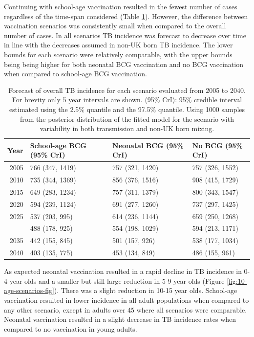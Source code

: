 \documentclass[11pt,twoside]{bristolthesis}
\begin{document}
  Continuing with school-age vaccination resulted in the fewest number of cases regardless of the time-span considered (Table \ref{tab:10-table-future-incidence}). However, the difference between vaccination scenarios was consistently small when compared to the overall number of cases. In all scenarios TB incidence was forecast to decrease over time in line with the decreases assumed in non-UK born TB incidence. The lower bounds for each scenario were relatively comparable, with the upper bounds being being higher for both neonatal BCG vaccination and no BCG vaccination when compared to school-age BCG vaccination.
  \begin{longtable}{rlll}
  \caption[Forecast of overall TB incidence for each scenario evaluated from 2005 to 2040.]{\label{tab:10-table-future-incidence}Forecast of overall TB incidence for each scenario evaluated from 2005 to 2040. For brevity only 5 year intervals are shown. (95\% CrI): 95\% credible interval estimated using the 2.5\% quantile and the 97.5\% quantile. Using 1000 samples from the posterior distribution of the fitted model for the scenario with variability in both transmission and non-UK born mixing.}\\
  \toprule
  Year & School-age BCG (95\% CrI) & Neonatal BCG (95\% CrI) & No BCG (95\% CrI)\\
  \midrule
  2005 & 766 (347, 1419) & 757 (321, 1420) & 757 (326, 1552)\\
  2010 & 735 (344, 1369) & 856 (376, 1516) & 908 (415, 1729)\\
  2015 & 649 (283, 1234) & 757 (311, 1379) & 800 (343, 1547)\\
  2020 & 594 (239, 1124) & 691 (277, 1260) & 737 (297, 1425)\\
  2025 & 537 (203, 995) & 614 (236, 1144) & 659 (250, 1268)\\
  \addlinespace
  2030 & 488 (178, 925) & 554 (198, 1029) & 594 (213, 1171)\\
  2035 & 442 (155, 845) & 501 (157, 926) & 538 (177, 1034)\\
  2040 & 403 (135, 775) & 453 (134, 849) & 486 (155, 961)\\
  \bottomrule
  \end{longtable}
  As expected neonatal vaccination resulted in a rapid decline in TB incidence in 0-4 year olds and a smaller but still large reduction in 5-9 year olds (Figure \ref{fig:10-age-scenarios-fig}). There was a slight reduction in 10-15 year olds. School-age vaccination resulted in lower incidence in all adult populations when compared to any other scenario, except in adults over 45 where all scenarios were comparable. Neonatal vaccination resulted in a slight decrease in TB incidence rates when compared to no vaccination in young adults.
  
\end{document}
